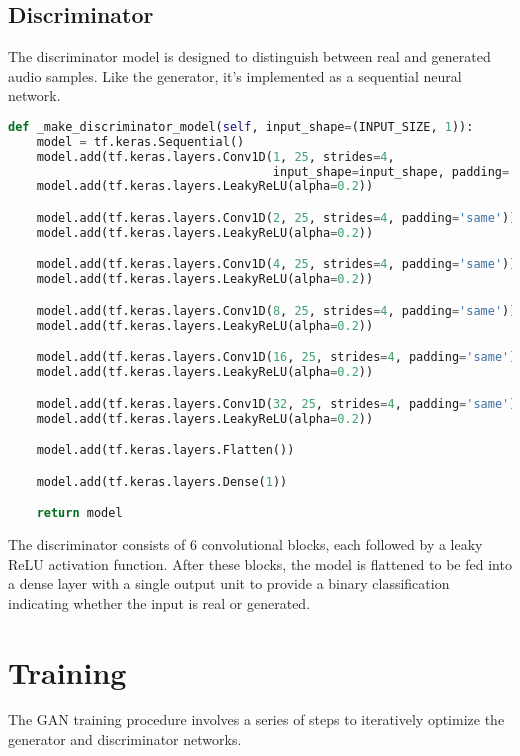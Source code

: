 \subsection{Discriminator}

The discriminator model is designed to distinguish between real and generated audio samples. Like the generator, it's implemented as a sequential neural network.

\begin{lstlisting}[language=Python, caption={Discriminator initialization}]
def _make_discriminator_model(self, input_shape=(INPUT_SIZE, 1)):
    model = tf.keras.Sequential()
    model.add(tf.keras.layers.Conv1D(1, 25, strides=4,
                                     input_shape=input_shape, padding='same'))
    model.add(tf.keras.layers.LeakyReLU(alpha=0.2))

    model.add(tf.keras.layers.Conv1D(2, 25, strides=4, padding='same'))
    model.add(tf.keras.layers.LeakyReLU(alpha=0.2))

    model.add(tf.keras.layers.Conv1D(4, 25, strides=4, padding='same'))
    model.add(tf.keras.layers.LeakyReLU(alpha=0.2))

    model.add(tf.keras.layers.Conv1D(8, 25, strides=4, padding='same'))
    model.add(tf.keras.layers.LeakyReLU(alpha=0.2))

    model.add(tf.keras.layers.Conv1D(16, 25, strides=4, padding='same'))
    model.add(tf.keras.layers.LeakyReLU(alpha=0.2))

    model.add(tf.keras.layers.Conv1D(32, 25, strides=4, padding='same'))
    model.add(tf.keras.layers.LeakyReLU(alpha=0.2))

    model.add(tf.keras.layers.Flatten())

    model.add(tf.keras.layers.Dense(1))

    return model
\end{lstlisting}

The discriminator consists of 6 convolutional blocks, each followed by a leaky \ac{ReLU} activation function. After these blocks, the model is flattened to be fed into a dense layer with a single output unit to provide a binary classification indicating whether the input is real or generated.

\section{Training}

The \ac{GAN} training procedure involves a series of steps to iteratively optimize the generator and discriminator networks.

